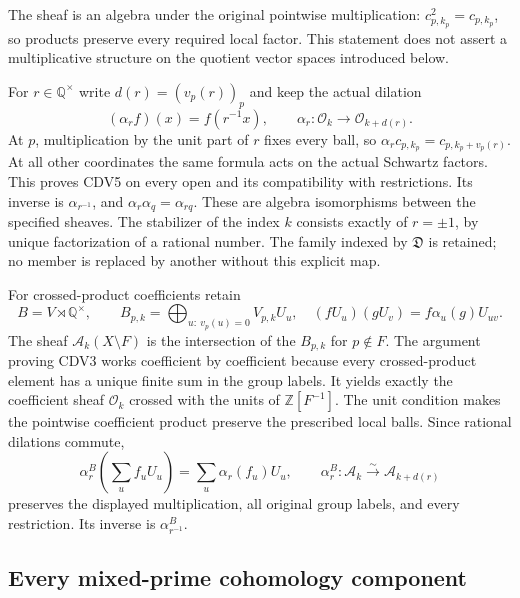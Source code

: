 \documentclass[11pt,a4paper]{article}
\theoremstyle{definition}\newtheorem{definition}[theorem]{Definition}
\begin{document}
The sheaf is an algebra under the original pointwise multiplication:
$c_{p,k_p}^2=c_{p,k_p}$, so products preserve every required local
factor. This statement does not assert a multiplicative structure on
the quotient vector spaces introduced below.

For $r\in\mathbb Q^\times$ write
$d(r)=(v_p(r))_p$ and keep the actual dilation
\begin{equation}\tag{CDV5}
 (\alpha_r f)(x)=f(r^{-1}x),\qquad
 \alpha_r:\mathcal O_k\longrightarrow\mathcal O_{k+d(r)}.
\end{equation}
At $p$, multiplication by the unit part of $r$ fixes every ball, so
$\alpha_r c_{p,k_p}=c_{p,k_p+v_p(r)}$. At all other coordinates the
same formula acts on the actual Schwartz factors. This proves CDV5
on every open and its compatibility with restrictions. Its inverse is
$\alpha_{r^{-1}}$, and $\alpha_r\alpha_q=\alpha_{rq}$. These are
algebra isomorphisms between the specified sheaves. The stabilizer of
the index $k$ consists exactly of $r=\pm1$, by unique factorization
of a rational number. The family indexed by $\mathfrak D$ is retained;
no member is replaced by another without this explicit map.

For crossed-product coefficients retain
\begin{equation}\tag{CDV6}
 B=V\rtimes\mathbb Q^\times,\qquad
 B_{p,k}=\bigoplus_{u:\ v_p(u)=0}V_{p,k}U_u,
 \quad (fU_u)(gU_v)=f\alpha_u(g)U_{uv}.
\end{equation}
The sheaf $\mathcal A_k(X\setminus F)$ is the intersection of the
$B_{p,k}$ for $p\notin F$. The argument proving CDV3 works coefficient
by coefficient because every crossed-product element has a unique
finite sum in the group labels. It yields exactly the coefficient
sheaf $\mathcal O_k$ crossed with the units of $\mathbb Z[F^{-1}]$.
The unit condition makes the pointwise coefficient product preserve
the prescribed local balls. Since rational dilations commute,
\begin{equation}\tag{CDV7}
 \alpha_r^B\left(\sum_u f_uU_u\right)
     =\sum_u\alpha_r(f_u)U_u,
 \qquad\alpha_r^B:\mathcal A_k\xrightarrow{\sim}\mathcal A_{k+d(r)}
\end{equation}
preserves the displayed multiplication, all original group labels,
and every restriction. Its inverse is $\alpha_{r^{-1}}^B$.

\subsection{Every mixed-prime cohomology component}
\end{document}
